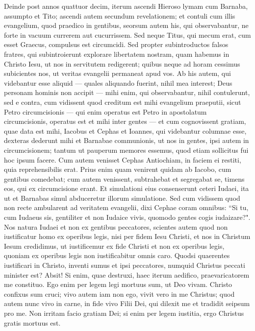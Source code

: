 \begin{biblechapter} 
\verse Deinde post annos quattuor decim, iterum ascendi Hieroso lymam cum Barnaba, assumpto et Tito;  
\verse ascendi autem secundum revelationem; et contuli cum illis evangelium, quod praedico in gentibus, seorsum autem his, qui observabantur, ne forte in vacuum currerem aut cucurrissem. 
\verse Sed neque Titus, qui mecum erat, cum esset Graecus, compulsus est circumcidi. 
\verse Sed propter subintroductos falsos fratres, qui subintroierunt explorare libertatem nostram, quam habemus in Christo Iesu, ut nos in servitutem redigerent; 
\verse quibus neque ad horam cessimus subicientes nos, ut veritas evangelii permaneat apud vos. 
\verse Ab his autem, qui videbantur esse aliquid — quales aliquando fuerint, nihil mea interest; Deus personam hominis non accipit — mihi enim, qui observabantur, nihil contulerunt, 
\verse sed e contra, cum vidissent quod creditum est mihi evangelium praeputii, sicut Petro circumcisionis 
\verse — qui enim operatus est Petro in apostolatum circumcisionis, operatus est et mihi inter gentes — 
\verse et cum cognovissent gratiam, quae data est mihi, Iacobus et Cephas et Ioannes, qui videbantur columnae esse, dexteras dederunt mihi et Barnabae communionis, ut nos in gentes, ipsi autem in circumcisionem; 
\verse tantum ut pauperum memores essemus, quod etiam sollicitus fui hoc ipsum facere. 
\verse Cum autem venisset Cephas Antiochiam, in faciem ei restiti, quia reprehensibilis erat. 
\verse Prius enim quam venirent quidam ab Iacobo, cum gentibus comedebat; cum autem venissent, subtrahebat et segregabat se, timens eos, qui ex circumcisione erant. 
\verse Et simulationi eius consenserunt ceteri Iudaei, ita ut et Barnabas simul abduceretur illorum simulatione. 
\verse Sed cum vidissem quod non recte ambularent ad veritatem evangelii, dixi Cephae coram omnibus: “Si tu, cum Iudaeus sis, gentiliter et non Iudaice vivis, quomodo gentes cogis iudaizare?". 
\verse Nos natura Iudaei et non ex gentibus peccatores, 
\verse scientes autem quod non iustificatur homo ex operibus legis, nisi per fidem Iesu Christi, et nos in Christum Iesum credidimus, ut iustificemur ex fide Christi et non ex operibus legis, quoniam ex operibus legis non iustificabitur omnis caro. 
\verse Quodsi quaerentes iustificari in Christo, inventi sumus et ipsi peccatores, numquid Christus peccati minister est? Absit! 
\verse Si enim, quae destruxi, haec iterum aedifico, praevaricatorem me constituo. 
\verse Ego enim per legem legi mortuus sum, ut Deo vivam. Christo confixus sum cruci; 
\verse vivo autem iam non ego, vivit vero in me Christus; quod autem nunc vivo in carne, in fide vivo Filii Dei, qui dilexit me et tradidit seipsum pro me. 
\verse Non irritam facio gratiam Dei; si enim per legem iustitia, ergo Christus gratis mortuus est. 
\end{biblechapter}

